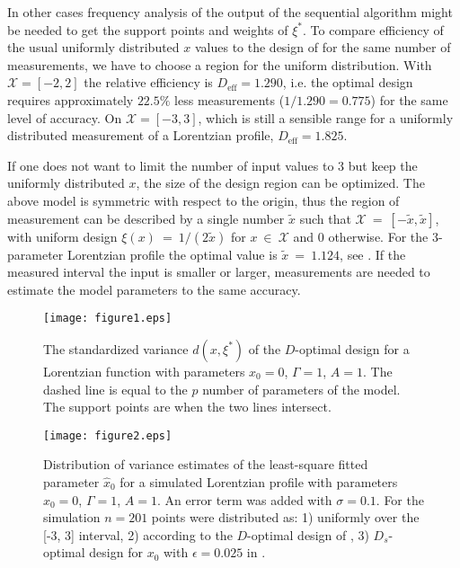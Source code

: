 \documentclass[12pt]{iopart}
\begin{document}
In other cases frequency analysis of the output of the sequential algorithm might be needed to get the support points and weights of $\xi^*$.
To compare efficiency of the usual uniformly distributed $x$ values to the design of  for the same number of measurements, we have to choose a region for the uniform distribution. With $\mathcal{X} = [-2, 2]$ the relative efficiency is $D_\mathrm{eff} = 1.290$, i.e. the optimal design requires approximately $22.5\%$ less measurements ($1/1.290 = 0.775$) for the same level of accuracy. On $\mathcal{X} =[-3, 3]$, which is still a sensible range for a uniformly distributed measurement of a Lorentzian profile, $D_\mathrm{eff} = 1.825$.

If one does not want to limit the number of input values to 3 but keep the uniformly distributed $x$, the size of the design region can be optimized. The above model is symmetric with respect to the origin, thus the region of measurement can be described by a single number $\tilde x$ such that $\mathcal{X}~=~[-\tilde x, \tilde x]$, with uniform design $\xi(x)~=~1/({2 \tilde x})$ for $x~\in~\mathcal{X}$ and $0$ otherwise. For the 3-parameter Lorentzian profile the optimal value is $\tilde x~=~1.124$, see . If the measured interval the input is smaller or larger, measurements are needed to estimate the model parameters to the same accuracy.

\begin{figure}
\texttt{[image: figure1.eps]}
\caption{The standardized variance $d(x, \xi^*)$ of the $D$-optimal design for a Lorentzian function with parameters $x_0=0$, $\Gamma = 1$, $A = 1$. The dashed line is equal to the $p$ number of parameters of the model. The support points are when the two lines intersect.}
\label{fig:lorentz3d}
\end{figure}

\begin{figure}
\texttt{[image: figure2.eps]}
\caption{Distribution of variance estimates of the least-square fitted parameter $\hat x_0$ for a simulated Lorentzian profile with parameters $x_0=0$, $\Gamma = 1$, $A = 1$. An error term was added with $\sigma=0.1$. For the simulation $n=201$ points were distributed as: 1) uniformly over the [-3, 3] interval, 2) according to the $D$-optimal design of , 3) $D_s$-optimal design for $x_0$ with $\epsilon = 0.025$ in .}
\label{fig:simvariance}
\end{figure}
\end{document}

